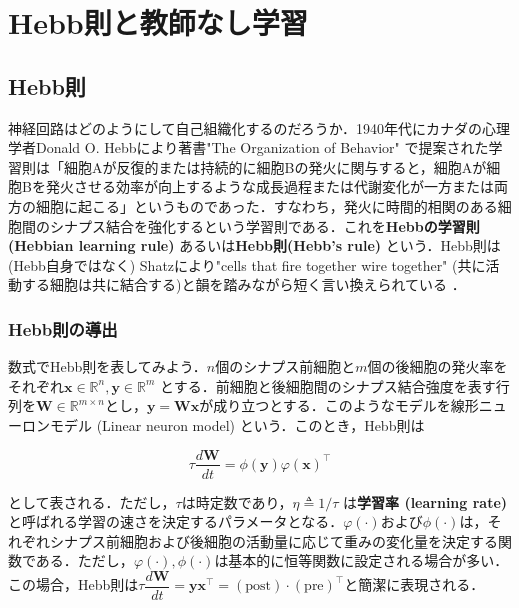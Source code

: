 \section{Hebb則と教師なし学習}
\subsection{Hebb則}
神経回路はどのようにして自己組織化するのだろうか．1940年代にカナダの心理学者Donald O. Hebbにより著書"The Organization of Behavior"\cite{Hebb1949-iv} で提案された学習則は「細胞Aが反復的または持続的に細胞Bの発火に関与すると，細胞Aが細胞Bを発火させる効率が向上するような成長過程または代謝変化が一方または両方の細胞に起こる」というものであった．すなわち，発火に時間的相関のある細胞間のシナプス結合を強化するという学習則である．これを\textbf{Hebbの学習則 (Hebbian learning rule)} あるいは\textbf{Hebb則(Hebb's rule)} という．Hebb則は (Hebb自身ではなく) Shatzにより"cells that fire together wire together" (共に活動する細胞は共に結合する)と韻を踏みながら短く言い換えられている \cite{Shatz1992-he}．

\subsubsection{Hebb則の導出}
数式でHebb則を表してみよう．$n$個のシナプス前細胞と$m$個の後細胞の発火率をそれぞれ$\mathbf{x}\in \mathbb{R}^n, \mathbf{y}\in \mathbb{R}^m$ とする．前細胞と後細胞間のシナプス結合強度を表す行列を$\mathbf{W}\in \mathbb{R}^{m\times n}$とし，$\mathbf{y}=\mathbf{W}\mathbf{x}$が成り立つとする．このようなモデルを線形ニューロンモデル (Linear neuron model) という．このとき，Hebb則は


\begin{equation}
\tau\frac{d\mathbf{W}}{dt}=\phi(\mathbf{y})\varphi(\mathbf{x})^\top
\end{equation}


として表される．ただし，$\tau$は時定数であり，$\eta\triangleq1/\tau$ は\textbf{学習率 (learning rate)} と呼ばれる学習の速さを決定するパラメータとなる．$\varphi(\cdot)$および$\phi(\cdot)$は，それぞれシナプス前細胞および後細胞の活動量に応じて重みの変化量を決定する関数である．ただし，$\varphi(\cdot), \phi(\cdot)$は基本的に恒等関数に設定される場合が多い．この場合，Hebb則は$
\tau\dfrac{d\mathbf{W}}{dt}=\mathbf{y}\mathbf{x}^\top=(\text{post})\cdot (\text{pre})^\top
$と簡潔に表現される．

